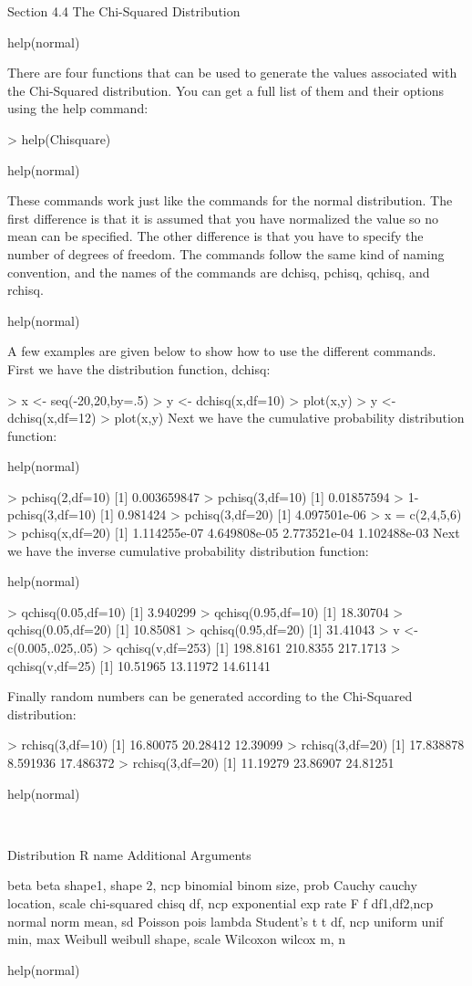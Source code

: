 Section 4.4 The Chi-Squared Distribution

help(normal)


There are four functions that can be used to generate the values associated with the Chi-Squared distribution. You can get a full list of them and their options using the help command:

> help(Chisquare)

help(normal)


These commands work just like the commands for the normal distribution. The first difference is that it is assumed that you have normalized the value so no mean can be specified. The other difference is that you have to specify the number of degrees of freedom. The commands follow the same kind of naming convention, and the names of the commands are dchisq, pchisq, qchisq, and rchisq.

help(normal)


A few examples are given below to show how to use the different commands. First we have the distribution function, dchisq:

> x <- seq(-20,20,by=.5)
> y <- dchisq(x,df=10)
> plot(x,y)
> y <- dchisq(x,df=12)
> plot(x,y)
Next we have the cumulative probability distribution function:

help(normal)


> pchisq(2,df=10)
[1] 0.003659847
> pchisq(3,df=10)
[1] 0.01857594
> 1-pchisq(3,df=10)
[1] 0.981424
> pchisq(3,df=20)
[1] 4.097501e-06
> x = c(2,4,5,6)
> pchisq(x,df=20)
[1] 1.114255e-07 4.649808e-05 2.773521e-04 1.102488e-03
Next we have the inverse cumulative probability distribution function:

help(normal)


> qchisq(0.05,df=10)
[1] 3.940299
> qchisq(0.95,df=10)
[1] 18.30704
> qchisq(0.05,df=20)
[1] 10.85081
> qchisq(0.95,df=20)
[1] 31.41043
> v <- c(0.005,.025,.05)
> qchisq(v,df=253)
[1] 198.8161 210.8355 217.1713
> qchisq(v,df=25)
[1] 10.51965 13.11972 14.61141

Finally random numbers can be generated according to the Chi-Squared distribution:

> rchisq(3,df=10)
[1] 16.80075 20.28412 12.39099
> rchisq(3,df=20)
[1] 17.838878  8.591936 17.486372
> rchisq(3,df=20)
[1] 11.19279 23.86907 24.81251


help(normal)

 

Distribution	R name	
Additional Arguments

beta	beta	shape1, shape 2, ncp
binomial	binom	size, prob
Cauchy	cauchy	location, scale
chi-squared	chisq	df, ncp
exponential	exp	rate
F	f	df1,df2,ncp
normal	norm	mean, sd
Poisson	pois	lambda
Student's t	t	df, ncp
uniform	unif	min, max
Weibull	weibull	shape, scale
Wilcoxon	wilcox	m, n
 

help(normal)


